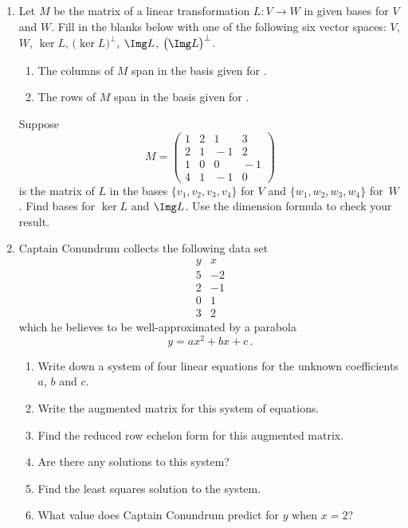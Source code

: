 \begin{enumerate}
\item Let $M$ be the matrix of a linear transformation $L:V\to W$ in given bases for $V$ and $W$.
Fill in the blanks below with one of the following six vector spaces: $V$, $W$, $\ker L$, 
$\big(\ker L\big)^\perp$, $\Img L$, $\big(\Img L\big)^\perp$.
\begin{enumerate}
\item The columns of $M$ span \underline{\phantom{answer}} in the basis given for \underline{\phantom{answer}}.
\item The rows of $M$ span \underline{\phantom{answer}} in the basis given for \underline{\phantom{answer}}.
\end{enumerate} 
Suppose \[M=\begin{pmatrix}1&2&1&3\\2&1&\!-1&2\\1&0&0&\!-1\\4&1&\!-1&0\end{pmatrix}\]
is the matrix of $L$ in the bases $\{v_1,v_2,v_3,v_4\}$ for $V$ and $\{w_1,w_2,w_3,w_4\}$ for~$W$.
Find bases for $\ker L$ and $\Img L$. Use the dimension formula to check your result.

\item
Captain Conundrum collects the following data set
\[
\begin{array}{c|c}
y&x\\
\hline
5&-2\\
2&-1\\
0&1\\
3&2
\end{array}
\]
which he believes to be well-approximated by a parabola
\[
y=ax^2+bx+c\, .
\]

\begin{enumerate}
\item Write down a system of four linear equations for the unknown coefficients $a$, $b$ and $c$.
\item Write the augmented matrix for this system of equations.
\item Find the reduced row echelon form for this augmented matrix.
\item Are there any solutions to this system?
\item Find the least squares solution to the system.
\item What value does Captain Conundrum predict for $y$ when $x=2$? 
\end{enumerate}



\end{enumerate}
